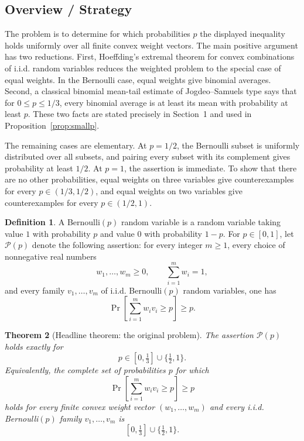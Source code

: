 \documentclass[12pt]{article}
\theoremstyle{definition}
\newtheorem{definition}{Definition}
\theoremstyle{plain}
\newtheorem{theorem}[definition]{Theorem}
\theoremstyle{remark}
\begin{document}
\date{}

\subsection*{Overview / Strategy}

The problem is to determine for which probabilities \(p\) the displayed inequality holds uniformly over all finite convex weight vectors. The main positive argument has two reductions. First, Hoeffding's extremal theorem for convex combinations of i.i.d. random variables reduces the weighted problem to the special case of equal weights. In the Bernoulli case, equal weights give binomial averages. Second, a classical binomial mean-tail estimate of Jogdeo--Samuels type says that for \(0\le p\le 1/3\), every binomial average is at least its mean with probability at least \(p\). These two facts are stated precisely in Section~1 and used in Proposition~\ref{prop:smallp}.

The remaining cases are elementary. At \(p=1/2\), the Bernoulli subset is uniformly distributed over all subsets, and pairing every subset with its complement gives probability at least \(1/2\). At \(p=1\), the assertion is immediate. To show that there are no other probabilities, equal weights on three variables give counterexamples for every \(p\in(1/3,1/2)\), and equal weights on two variables give counterexamples for every \(p\in(1/2,1)\).

\begin{definition}
A Bernoulli\((p)\) random variable is a random variable taking value \(1\) with probability \(p\) and value \(0\) with probability \(1-p\). For \(p\in[0,1]\), let \(\mathcal P(p)\) denote the following assertion:
for every integer \(m\ge1\), every choice of nonnegative real numbers
\[
w_1,\ldots,w_m\ge0,\qquad \sum_{i=1}^{m}w_i=1,
\]
and every family \(v_1,\ldots,v_m\) of i.i.d. Bernoulli\((p)\) random variables, one has
\[
\Pr\!\left[\sum_{i=1}^{m}w_i v_i\ge p\right]\ge p.
\]
\end{definition}

\begin{theorem}[Headline theorem: the original problem]\label{thm:main}
The assertion \(\mathcal P(p)\) holds exactly for
\[
p\in[0,\tfrac13]\cup\{\tfrac12,1\}.
\]
Equivalently, the complete set of probabilities \(p\) for which
\[
\Pr\!\left[\sum_{i=1}^{m} w_i v_i\ge p\right]\ge p
\]
holds for every finite convex weight vector \((w_1,\ldots,w_m)\) and every i.i.d. Bernoulli\((p)\) family \(v_1,\ldots,v_m\) is
\[
\boxed{[0,\tfrac13]\cup\{\tfrac12,1\}}.
\]
\end{theorem}
\end{document}

